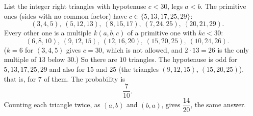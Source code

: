List the integer right triangles with hypotenuse $c<30$, legs $a<b$. The primitive ones (sides with no common factor) have $c\in\{5,13,17,25,29\}$:
\[
(3,4,5),\ (5,12,13),\ (8,15,17),\ (7,24,25),\ (20,21,29).
\]
Every other one is a multiple $k(a,b,c)$ of a primitive one with $kc<30$:
\[
(6,8,10),\ (9,12,15),\ (12,16,20),\ (15,20,25),\ (10,24,26).
\]
($k=6$ for $(3,4,5)$ gives $c=30$, which is not allowed, and $2\cdot13=26$ is the only multiple of $13$ below $30$.) So there are $10$ triangles. The hypotenuse is odd for $5,13,17,25,29$ and also for $15$ and $25$ (the triangles $(9,12,15)$, $(15,20,25)$), that is, for $7$ of them. The probability is
\[
\boxed{\dfrac{7}{10}} .
\]
Counting each triangle twice, as $(a,b)$ and $(b,a)$, gives $\dfrac{14}{20}$, the same answer.
